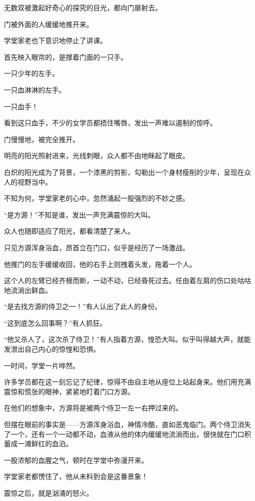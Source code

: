 \begin{this_body}
无数双被激起好奇心的探究的目光，都向门扉射去。

门被外面的人缓缓地推开来。

学堂家老也下意识地停止了讲课。

首先映入眼帘的，是撑着门面的一只手。

一只少年的左手。

一只血淋淋的左手。

一只血手！

看到这只血手，不少的女学员都捂住嘴唇，发出一声难以遏制的惊呼。

门慢慢地，被完全推开。

明亮的阳光照射进来，光线刺眼，众人都不由地眯起了眼皮。

白炽的阳光成为了背景，一个漆黑的剪影，勾勒出一个身材瘦削的少年，呈现在众人的视野当中。

不知为何，学堂家老的心中，忽然涌起一股强烈的不妙之感。

“是方源！”不知是谁，发出一声充满震惊的大叫。

众人也随即适应了阳光，都看清楚了来人。

只见方源浑身浴血，昂首立在门口，似乎是经历了一场激战。

他推门的左手缓缓收回，他的右手上则拽着头发，拖着一个人。

这个人的左臂已经齐根而断，一动不动，已经昏死过去。任由着左肩的伤口处咕咕地流淌出鲜血。

“是去找方源的侍卫之一！”有人认出了此人的身份。

“这到底怎么回事啊？”有人抓狂。

“他又杀人了，这次杀了侍卫！”有人指着方源，惶恐大叫。似乎叫得越大声，就能发泄出自己内心的惊惶和恐惧。

一时间，学堂一片哗然。

许多学员都在这一刻忘记了纪律，惊得不由自主地从座位上站起身来。他们用充满震惊和慌张的眼神，紧紧地盯着门口方源。

在他们的想象中，方源将是被两个侍卫一左一右押过来的。

但摆在眼前的事实是——方源浑身浴血，神情冷酷，直如恶鬼临门。两个侍卫消失了一个，还有一个一动都不动，血液从他的体内缓缓地流淌而出，很快就在门口积蓄成一滩鲜红的血泊。

一股浓郁的血腥之气，顿时在学堂中弥漫开来。

学堂家老都愣住了，他从未料到会是这番景象！

震惊之后，就是汹涌的怒火。


\end{this_body}
